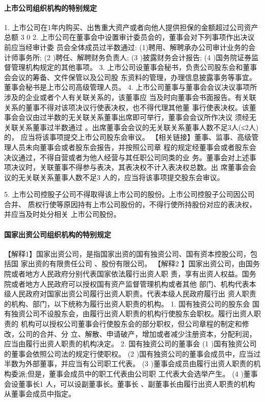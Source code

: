 \documentclass[UTF8,12pt]{ctexart}
\numberwithin{equation}{section} %
\numberwithin{figure}{section}
\numberwithin{table}{section}
\begin{document}
	\paragraph{上市公司组织机构的特别规定}
	1. 上市公司在1年内购买、出售重大资产或者向他人提供担保的金额超过公司资产总额 3 0%
	2. 上市公司在董事会中设置审计委员会的，董事会对下列事项作出决议前应当经审计委 员会全体成员过半数通过:
	(1)聘用、解聘承办公司审计业务的会计师事务所;
	(2 )聘任、解聘财务负责人;
	(3 )披露财务会计报告;
	(4 )国务院证券监督管理机构规定的其他事项。
	3. 上市公司设董事会秘书，负责公司股东会和董事会会议的筹备、文件保管以及公司股 东资料的管理，办理信息披露事务等事宜。董事会秘书是上市公司高级管理人员。
	4. 上市公司董事与董事会会议决议事项所涉及的企业或者个人有关联关系的，该董事应 当及时向董事会书面报告。有关联关系的董事不得对该项决议行使表决权，也不得代理其他董
	事行使表决权。该董事会会议由过半数的无关联关系董事出席即可举行，董事会会议所作决议 须经无关联关系董事过半数通过 。出席董事会会议的无关联关系董事人数不足3人(≤2人)的， 应当将该事项提交上市公司股东会审议。
	【相关链接】董事、监事、高级管理人员未向董事会或者股东会报告，并按照公司章 程的规定经董事会或者股东会决议通过，不得自营或者为他人经营与其任职公司同类的业 务。董事会对上述事项决议时，关联董事不得参与表决，其表决权不计入表决权总数。出 席董事会会议的无关联关系董事人数不足3 人的，应当将该事项提交股东会审议。
	
	5. 上市公司控股子公司不得取得该上市公司的股份。上市公司控股子公司因公司合并、 质权行使等原因持有上市公司股份的，不得行使所持股份对应的表决权，并应当及时处分相关 上市公司股份。
	
	\paragraph{国家出资公司组织机构的特别规定}
	【解释1】国家出资公司，是指国家出资的国有独资公司、国有资本控股公司，包括国 家出资的有限贵任公司 、股份有限公司。
	【解释2 】国家出资公司，由国务院或者地方人民政府分别代表国家依法履行出资人职 责，享有出资人权益。国务院或者地方人民政府可以授权国有资产监督管理机构或者其他 部门、机构代表本级人民政府对国家出资公司履行出资人职责。代表本级人民政府履行出 资人职责的机构、部门，以下统称为履行出资人职责的机构。
	1. 国有独资公司的股东会 国有独资公司不设股东会，由履行出资人职责的机构行使股东会职权。履行出资人职责的 机构可以授权公司董事会行使股东会的部分职权，但公司章程的制定和修改，公司的合并、分 立、解散、申请破产，增加或者减少注册资本，分配利润，应当由履行出资人职责的机构决定。 2. 国有独资公司的董事会
	(1 )国有独资公司的董事会依照公司法的规定行使职权。
	(2 )国有独资公司的董事会成员中，应当过半数为外部董事，并应当有公司职工代表。 (3 )董事会成员由履行出资人职责的机构委派;但是，董事会成员中的职工代表由公司职 工代表大会选举产生。
	(4 )董事会设董事长1 人，可以设副董事长。董事长 、副董事长由履行出资人职责的机构 从董事会成员中指定。
	
\end{document}
